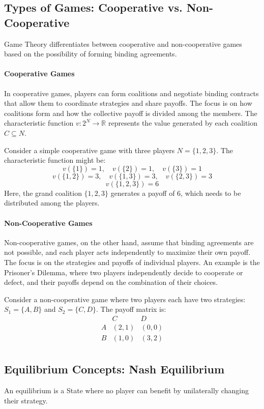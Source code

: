 \documentclass[12pt]{book} %
\begin{document}
\subsection{Types of Games: Cooperative vs. Non-Cooperative}
Game Theory differentiates between cooperative and non-cooperative games based on the possibility of forming binding agreements.

\paragraph{Cooperative Games}
In cooperative games, players can form coalitions and negotiate binding contracts that allow them to coordinate strategies and share payoffs. The focus is on how coalitions form and how the collective payoff is divided among the members. The characteristic function \( v: 2^N \rightarrow \mathbb{R} \) represents the value generated by each coalition \( C \subseteq N \).

Consider a simple cooperative game with three players \( N = \{1, 2, 3\} \). The characteristic function might be:
\[
v(\{1\}) = 1, \quad v(\{2\}) = 1, \quad v(\{3\}) = 1
\]
\[
v(\{1, 2\}) = 3, \quad v(\{1, 3\}) = 3, \quad v(\{2, 3\}) = 3
\]
\[
v(\{1, 2, 3\}) = 6
\]
Here, the grand coalition \( \{1, 2, 3\} \) generates a payoff of 6, which needs to be distributed among the players.

\paragraph{Non-Cooperative Games}
Non-cooperative games, on the other hand, assume that binding agreements are not possible, and each player acts independently to maximize their own payoff. The focus is on the strategies and payoffs of individual players. An example is the Prisoner's Dilemma, where two players independently decide to cooperate or defect, and their payoffs depend on the combination of their choices.

Consider a non-cooperative game where two players each have two strategies: \( S_1 = \{A, B\} \) and \( S_2 = \{C, D\} \). The payoff matrix is:
\[
\begin{array}{c|c|c}
 & C & D \\
\hline
A & (2, 1) & (0, 0) \\
\hline
B & (1, 0) & (3, 2) \\
\end{array}
\]

\subsection{Equilibrium Concepts: Nash Equilibrium}
An equilibrium is a State where no player can benefit by unilaterally changing their strategy.
\end{document}
